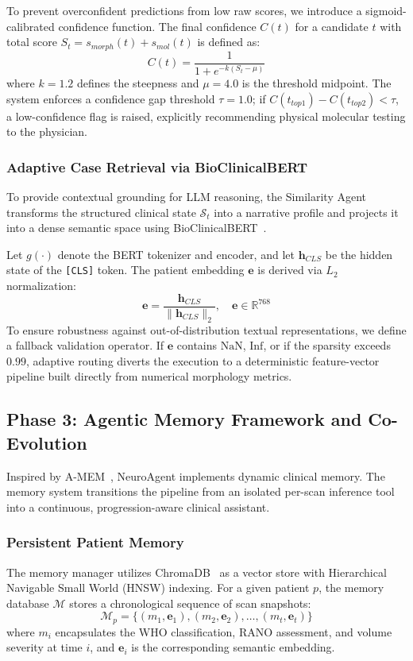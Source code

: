 To prevent overconfident predictions from low raw scores, we introduce a sigmoid-calibrated confidence function. The final confidence $C(t)$ for a candidate $t$ with total score $S_t = s_{morph}(t) + s_{mol}(t)$ is defined as:
\begin{equation}
C(t) = \frac{1}{1 + e^{-k(S_t - \mu)}}
\end{equation}
where $k = 1.2$ defines the steepness and $\mu = 4.0$ is the threshold midpoint. The system enforces a confidence gap threshold $\tau = 1.0$; if $C(t_{top1}) - C(t_{top2}) < \tau$, a low-confidence flag is raised, explicitly recommending physical molecular testing to the physician.

\subsubsection{Adaptive Case Retrieval via BioClinicalBERT}
To provide contextual grounding for LLM reasoning, the Similarity Agent transforms the structured clinical state $\mathcal{S}_t$ into a narrative profile and projects it into a dense semantic space using BioClinicalBERT~\cite{alsentzer2019clinical}. 

Let $g(\cdot)$ denote the BERT tokenizer and encoder, and let $\mathbf{h}_{CLS}$ be the hidden state of the \texttt{[CLS]} token. The patient embedding $\mathbf{e}$ is derived via $L_2$ normalization:
\begin{equation}
\mathbf{e} = \frac{\mathbf{h}_{CLS}}{\|\mathbf{h}_{CLS}\|_2}, \quad \mathbf{e} \in \mathbb{R}^{768}
\end{equation}
To ensure robustness against out-of-distribution textual representations, we define a fallback validation operator. If $\mathbf{e}$ contains $\text{NaN}$, $\text{Inf}$, or if the sparsity exceeds $0.99$, adaptive routing diverts the execution to a deterministic feature-vector pipeline built directly from numerical morphology metrics.

\subsection{Phase 3: Agentic Memory Framework and Co-Evolution}

Inspired by A-MEM~\cite{amem2024}, NeuroAgent implements dynamic clinical memory. The memory system transitions the pipeline from an isolated per-scan inference tool into a continuous, progression-aware clinical assistant.

\subsubsection{Persistent Patient Memory}
The memory manager utilizes ChromaDB~\cite{chromadb2024} as a vector store with Hierarchical Navigable Small World (HNSW) indexing. For a given patient $p$, the memory database $\mathcal{M}$ stores a chronological sequence of scan snapshots:
\begin{equation}
\mathcal{M}_p = \{ (m_1, \mathbf{e}_1), (m_2, \mathbf{e}_2), \dots, (m_t, \mathbf{e}_t) \}
\end{equation}
where $m_i$ encapsulates the WHO classification, RANO assessment, and volume severity at time $i$, and $\mathbf{e}_i$ is the corresponding semantic embedding.


